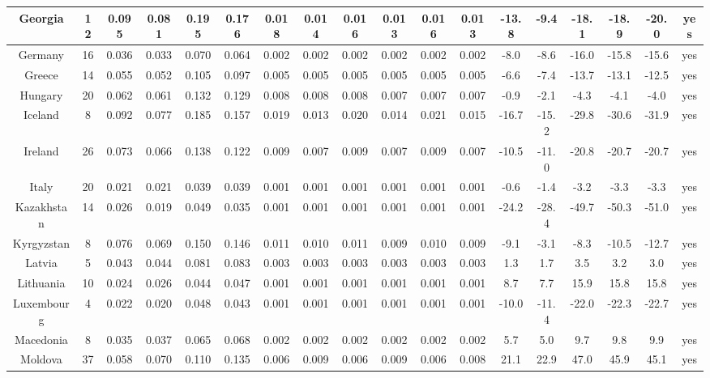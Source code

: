 \documentclass[10pt]{article}
\begin{document}
\begin{center}
\begin{tabular}{|c|c|c|c|c|c|c|c|c|c|c|c|c|c|c|c|c|c|}
\hline
Georgia & 12 & 0.095 & 0.081 & 0.195 & 0.176 & 0.018 & 0.014 & 0.016 & 0.013 & 0.016 & 0.013 & -13.8 & -9.4 & -18.1 & -18.9 & -20.0 & yes \\
\hline
Germany & 16 & 0.036 & 0.033 & 0.070 & 0.064 & 0.002 & 0.002 & 0.002 & 0.002 & 0.002 & 0.002 & -8.0 & -8.6 & -16.0 & -15.8 & -15.6 & yes \\
\hline
Greece & 14 & 0.055 & 0.052 & 0.105 & 0.097 & 0.005 & 0.005 & 0.005 & 0.005 & 0.005 & 0.005 & -6.6 & -7.4 & -13.7 & -13.1 & -12.5 & yes \\
\hline
Hungary & 20 & 0.062 & 0.061 & 0.132 & 0.129 & 0.008 & 0.008 & 0.008 & 0.007 & 0.007 & 0.007 & -0.9 & -2.1 & -4.3 & -4.1 & -4.0 & yes \\
\hline
Iceland & 8 & 0.092 & 0.077 & 0.185 & 0.157 & 0.019 & 0.013 & 0.020 & 0.014 & 0.021 & 0.015 & -16.7 & -15.2 & -29.8 & -30.6 & -31.9 & yes \\
\hline
Ireland & 26 & 0.073 & 0.066 & 0.138 & 0.122 & 0.009 & 0.007 & 0.009 & 0.007 & 0.009 & 0.007 & -10.5 & -11.0 & -20.8 & -20.7 & -20.7 & yes \\
\hline
Italy & 20 & 0.021 & 0.021 & 0.039 & 0.039 & 0.001 & 0.001 & 0.001 & 0.001 & 0.001 & 0.001 & -0.6 & -1.4 & -3.2 & -3.3 & -3.3 & yes \\
\hline
Kazakhstan & 14 & 0.026 & 0.019 & 0.049 & 0.035 & 0.001 & 0.001 & 0.001 & 0.001 & 0.001 & 0.001 & -24.2 & -28.4 & -49.7 & -50.3 & -51.0 & yes \\
\hline
Kyrgyzstan & 8 & 0.076 & 0.069 & 0.150 & 0.146 & 0.011 & 0.010 & 0.011 & 0.009 & 0.010 & 0.009 & -9.1 & -3.1 & -8.3 & -10.5 & -12.7 & yes \\
\hline
Latvia & 5 & 0.043 & 0.044 & 0.081 & 0.083 & 0.003 & 0.003 & 0.003 & 0.003 & 0.003 & 0.003 & 1.3 & 1.7 & 3.5 & 3.2 & 3.0 & yes \\
\hline
Lithuania & 10 & 0.024 & 0.026 & 0.044 & 0.047 & 0.001 & 0.001 & 0.001 & 0.001 & 0.001 & 0.001 & 8.7 & 7.7 & 15.9 & 15.8 & 15.8 & yes \\
\hline
Luxembourg & 4 & 0.022 & 0.020 & 0.048 & 0.043 & 0.001 & 0.001 & 0.001 & 0.001 & 0.001 & 0.001 & -10.0 & -11.4 & -22.0 & -22.3 & -22.7 & yes \\
\hline
Macedonia & 8 & 0.035 & 0.037 & 0.065 & 0.068 & 0.002 & 0.002 & 0.002 & 0.002 & 0.002 & 0.002 & 5.7 & 5.0 & 9.7 & 9.8 & 9.9 & yes \\
\hline
Moldova & 37 & 0.058 & 0.070 & 0.110 & 0.135 & 0.006 & 0.009 & 0.006 & 0.009 & 0.006 & 0.008 & 21.1 & 22.9 & 47.0 & 45.9 & 45.1 & yes \\

\end{tabular}
\end{center}
\end{document}
